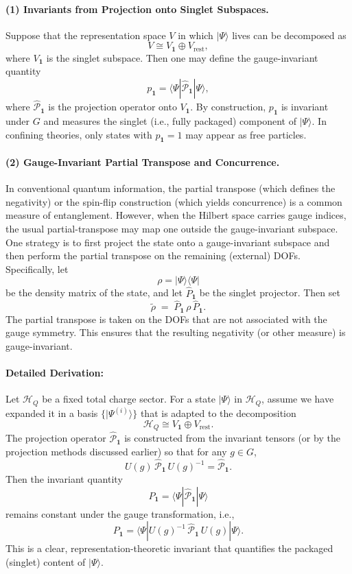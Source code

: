 \documentclass[12pt,a4paper]{article}
\begin{document}
\paragraph{(1) Invariants from Projection onto Singlet Subspaces.}
Suppose that the representation space $V$ in which $|\Psi\rangle$ lives can be decomposed as 
\[
V \cong V_{\mathbf{1}} \oplus V_{\text{rest}},
\]
where $V_{\mathbf{1}}$ is the singlet subspace.
Then one may define the gauge-invariant quantity
\[
p_{\mathbf{1}} = \langle \Psi| \hat{\mathcal{P}}_{\mathbf{1}}|\Psi\rangle,
\]
where $\hat{\mathcal{P}}_{\mathbf{1}}$ is the projection operator onto $V_{\mathbf{1}}$.
By construction, $p_{\mathbf{1}}$ is invariant under $G$ and measures the singlet (i.e., fully packaged) component of $|\Psi\rangle$.
In confining theories, only states with $p_{\mathbf{1}} = 1$ may appear as free particles.



\paragraph{(2) Gauge-Invariant Partial Transpose and Concurrence.}
In conventional quantum information, the partial transpose (which defines the negativity) or the spin-flip construction (which yields concurrence) is a common measure of entanglement.
However, when the Hilbert space carries gauge indices, the usual partial-transpose may map one outside the gauge-invariant subspace.
One strategy is to first project the state onto a gauge-invariant subspace and then perform the partial transpose on the remaining (external) DOFs. Specifically, let 
\[
\rho = |\Psi\rangle\langle\Psi|
\]
be the density matrix of the state, and let $\hat P_{\mathbf1}$ be the singlet projector.
Then set
\[
\tilde\rho \;=\;\hat P_{\mathbf1}\,\rho\,\hat P_{\mathbf1}. 
\]
The partial transpose is taken on the DOFs that are not associated with the gauge symmetry.
This ensures that the resulting negativity (or other measure) is gauge-invariant.


\paragraph{Detailed Derivation:}
Let $\mathcal H_Q$ be a fixed total charge sector.
For a state $|\Psi\rangle$ in $\mathcal{H}_Q$, assume we have expanded it in a basis $\{|\Psi^{(i)}\rangle\}$ that is adapted to the decomposition
\[
\mathcal{H}_Q \cong V_{\mathbf{1}} \oplus V_{\text{rest}}.
\]
The projection operator $\hat{\mathcal{P}}_{\mathbf{1}}$ is constructed from the invariant tensors (or by the projection methods discussed earlier) so that for any $g\in G$,
\[
U(g)\,\hat{\mathcal{P}}_{\mathbf{1}}\,U(g)^{-1} = \hat{\mathcal{P}}_{\mathbf{1}}.
\]
Then the invariant quantity 
\[
P_{\mathbf{1}} = \langle\Psi|\hat{\mathcal{P}}_{\mathbf{1}}|\Psi\rangle
\]
remains constant under the gauge transformation, i.e.,
\[
P_{\mathbf{1}} = \langle\Psi|U(g)^{-1}\,\hat{\mathcal{P}}_{\mathbf{1}}\,U(g)|\Psi\rangle.
\]
This is a clear, representation-theoretic invariant that quantifies the packaged (singlet) content of $|\Psi\rangle$.
\end{document}
